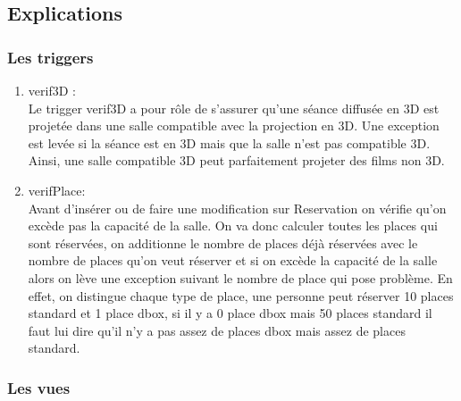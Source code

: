 \documentclass[a4paper,sffamily,12pt]{article}
\begin{document}
		\subsection{Explications}

				\vspace{0.5cm}

				\subsubsection{Les triggers}
				
					\vspace{0.5cm}

					\begin{enumerate}[label=\ding{228}]
					
						\item verif3D : \\
						
							Le trigger verif3D a pour rôle de s'assurer qu'une séance diffusée en 3D est projetée dans une salle compatible avec la projection en 3D. Une exception est levée si la séance est en 3D mais que la salle n'est pas compatible 3D. Ainsi, une salle compatible 3D peut parfaitement projeter des films non 3D.\\
											
						\item verifPlace: \\
						
							Avant d'insérer ou de faire une modification sur Reservation on vérifie qu'on excède pas la capacité de la salle. On va donc calculer toutes les places qui sont réservées, on additionne le nombre de places déjà réservées avec le nombre de places qu'on veut réserver et si on excède la capacité de la salle alors on lève une exception suivant le nombre de place qui pose problème. En effet, on distingue chaque type de place, une personne peut réserver 10 places standard et 1 place dbox, si il y a 0 place dbox mais 50 places standard il faut lui dire qu'il n'y a pas assez de places dbox mais assez de places standard.\\
						
					\end{enumerate}

				\subsubsection{Les vues}
				
					\vspace{0.5cm}
\end{document}
